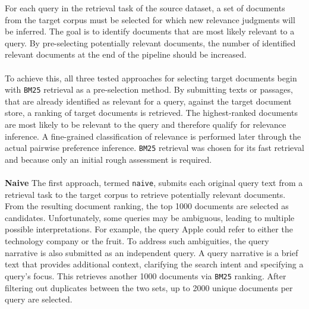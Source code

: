 For each query in the retrieval task of the source dataset, a set of documents from the target corpus must be selected for which new relevance judgments will be inferred. The goal is to identify documents that are most likely relevant to a query. By pre-selecting potentially relevant documents, the number of identified relevant documents at the end of the pipeline should be increased.
\\\\
To achieve this, all three tested approaches for selecting target documents begin with \texttt{BM25} retrieval as a pre-selection method. By submitting texts or passages, that are already identified as relevant for a query, against the target document store, a ranking of target documents is retrieved. The highest-ranked documents are most likely to be relevant to the query and therefore qualify for relevance inference. A fine-grained classification of relevance is performed later through the actual pairwise preference inference. \texttt{BM25} retrieval was chosen for its fast retrieval and because only an initial rough assessment is required.
\\\\
\textbf{Naive} The first approach, termed \texttt{naive}, submits each original query text from a retrieval task to the target corpus to retrieve potentially relevant documents. From the resulting document ranking, the top 1000 documents are selected as candidates. Unfortunately, some queries may be ambiguous, leading to multiple possible interpretations. For example, the query \glqq Apple\grqq{} could refer to either the technology company or the fruit. To address such ambiguities, the query narrative is also submitted as an independent query. A query narrative is a brief text that provides additional context, clarifying the search intent and specifying a query's focus. This retrieves another 1000 documents via \texttt{BM25} ranking. After filtering out duplicates between the two sets, up to 2000 unique documents per query are selected.
\\\\
